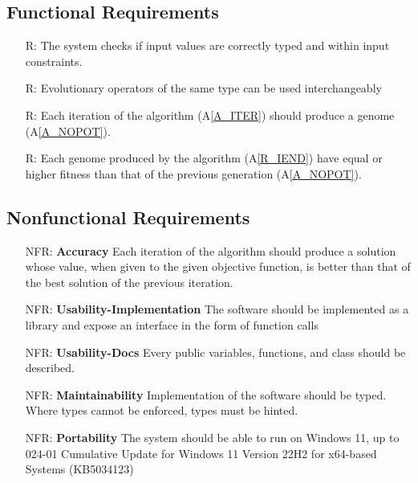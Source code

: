 \documentclass[12pt]{article}
\newcommand{\aref}[1]{A\ref{#1}}
\newcounter{reqnum} %
\newcounter{nfrnum} %
\begin{document}
\subsection{Functional Requirements}
\label{subsubsec:freq}
\noindent \begin{itemize}
\item[R\refstepcounter{reqnum}\thereqnum \label{R_TYPECHECK}:] The system checks if input values are correctly typed and within input constraints.

\item[R\refstepcounter{reqnum}\thereqnum \label{R_EVOCHANGE}:] Evolutionary operators of the same type can be used interchangeably 

\item[] \item[R\refstepcounter{reqnum}\thereqnum \label{R_IEND}:] Each iteration of the algorithm (\aref{A_ITER}) should produce a genome (\aref{A_NOPOT}).
\item[R\refstepcounter{reqnum}\thereqnum \label{R_IMBETTER}:] Each genome produced by the algorithm (\aref{R_IEND}) have equal or higher fitness than that of the previous generation (\aref{A_NOPOT}).

\end{itemize}

\subsection{Nonfunctional Requirements}
\label{subsubsec:nfreq}


\noindent \begin{itemize}

\item[NFR\refstepcounter{nfrnum}\thenfrnum \label{NFR_Accuracy}:]
  \textbf{Accuracy} Each iteration of the algorithm should produce a solution whose value, when given to the given objective function, is better than that of the best solution of the previous iteration.

\item[NFR\refstepcounter{nfrnum}\thenfrnum \label{NFR_Usability-Impl}:] \textbf{Usability-Implementation}
  The software should be implemented as a library and expose an interface in the form of function calls

  \item[NFR\refstepcounter{nfrnum}\thenfrnum \label{NFR_Usability}:] \textbf{Usability-Docs}
  Every public variables, functions, and class should be described.

\item[NFR\refstepcounter{nfrnum}\thenfrnum \label{NFR_Maintainability}:]
  \textbf{Maintainability} 
  Implementation of the software should be typed. Where types cannot be enforced, types must be hinted.

\item[NFR\refstepcounter{nfrnum}\thenfrnum \label{NFR_Portability}:]
  \textbf{Portability} The system should be able to run on Windows 11, up to 024-01 Cumulative Update for Windows 11 Version 22H2 for x64-based Systems (KB5034123)
  

\end{itemize}
\end{document}

